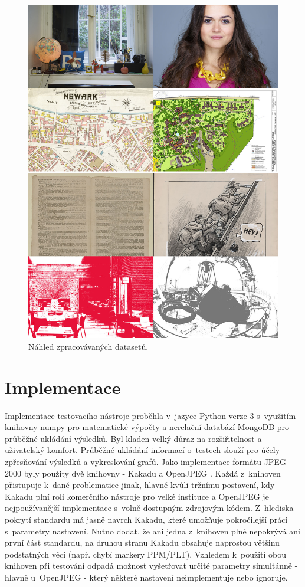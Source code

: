 \vspace{3.5cm}
\begin{figure}[hbt!]
  \centering
  \hspace*{-0.75cm}
  \includegraphics[width=16cm]{obrazky-figures/fotky.jpg}
  \caption{Náhled zpracovávaných datasetů.}
  \label{keepCalm}
\end{figure}


\clearpage
\newpage
\section{Implementace} 
Implementace testovacího nástroje proběhla v~jazyce Python verze 3 s~využitím knihovny numpy pro matematické výpočty a nerelační databází MongoDB pro průběžné ukládání výsledků. Byl kladen velký důraz na rozšiřitelnost a uživatelský komfort. Průběžné ukládání informací o~testech slouží pro účely zpřesňování výsledků a vykreslování grafů. Jako implementace formátu JPEG 2000 byly použity dvě knihovny - Kakadu \cite{kakadu_docs} a OpenJPEG \cite{open_docs}. Každá z~knihoven přistupuje k~dané problematice jinak, hlavně kvůli tržnímu postavení, kdy Kakadu plní roli komerčního nástroje pro velké instituce a OpenJPEG je nejpoužívanější implementace s~volně dostupným zdrojovým kódem. Z~hlediska pokrytí standardu má jasně navrch Kakadu, které umožňuje pokročilejší práci s~parametry nastavení. Nutno dodat, že ani jedna z~knihoven plně nepokrývá ani první část standardu, na druhou stranu Kakadu obsahuje naprostou většinu podstatných věcí (např. chybí markery PPM/PLT). Vzhledem k~použití obou knihoven při testování odpadá možnost vyšetřovat určité parametry simultánně - hlavně u~OpenJPEG - který některé nastavení neimplementuje nebo ignoruje.

